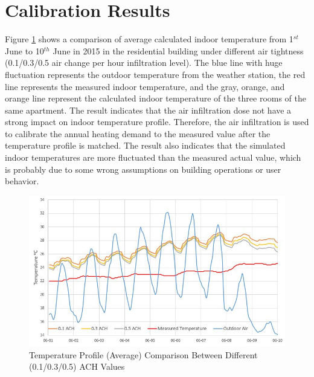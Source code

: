 \documentclass[a4paper, oneside]{discothesis}
\begin{document}
		



	\newpage
	\section{Calibration Results}

			Figure \ref{fig:ACH_Compare} shows a comparison of average calculated indoor temperature from 1$^{st}$ June to 10$^{th}$ June in 2015 in the residential building under different air tightness (0.1/0.3/0.5 air change per hour infiltration level). The blue line with huge fluctuation represents the outdoor temperature from the weather station, the red line represents the measured indoor temperature, and the gray, orange, and orange line represent the calculated indoor temperature of the three rooms of the same apartment. The result indicates that the air infiltration dose not have a strong impact on indoor temperature profile. Therefore, the air infiltration is used to calibrate the annual heating demand to the measured value after the temperature profile is matched. The result also indicates that the simulated indoor temperatures are more fluctuated than the measured actual value, which is probably due to some wrong assumptions on building operations or user behavior.\\
		
			\begin{figure}[H]
			\centering
			\includegraphics[scale=0.75]{ACH_Compare.JPG}
			\caption{Temperature Profile (Average) Comparison Between Different (0.1/0.3/0.5) ACH Values}
			\label{fig:ACH_Compare}
			\end{figure}
\end{document}
